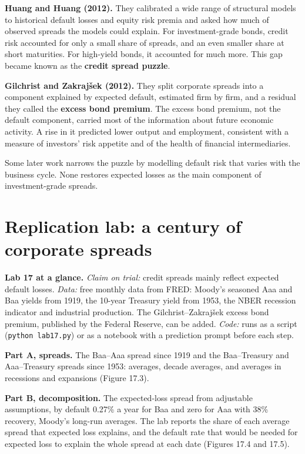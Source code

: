 \textbf{Huang and Huang (2012).} They calibrated a wide range of structural models to historical default losses and equity risk premia and asked how much of observed spreads the models could explain. For investment-grade bonds, credit risk accounted for only a small share of spreads, and an even smaller share at short maturities. For high-yield bonds, it accounted for much more. This gap became known as the \textbf{credit spread puzzle}.

\textbf{Gilchrist and Zakraj\v{s}ek (2012).} They split corporate spreads into a component explained by expected default, estimated firm by firm, and a residual they called the \textbf{excess bond premium}. The excess bond premium, not the default component, carried most of the information about future economic activity. A rise in it predicted lower output and employment, consistent with a measure of investors' risk appetite and of the health of financial intermediaries.

Some later work narrows the puzzle by modelling default risk that varies with the business cycle. None restores expected losses as the main component of investment-grade spreads.

\section{Replication lab: a century of corporate spreads}
\label{sec:17-lab}

\begin{callout}
\textbf{Lab 17 at a glance.} \emph{Claim on trial:} credit spreads mainly reflect expected default losses. \emph{Data:} free monthly data from FRED: Moody's seasoned Aaa and Baa yields from 1919, the 10-year Treasury yield from 1953, the NBER recession indicator and industrial production. The Gilchrist--Zakraj\v{s}ek excess bond premium, published by the Federal Reserve, can be added. \emph{Code:} runs as a script (\texttt{python lab17.py}) or as a notebook with a prediction prompt before each step.
\end{callout}

\textbf{Part A, spreads.} The Baa--Aaa spread since 1919 and the Baa--Treasury and Aaa--Treasury spreads since 1953: averages, decade averages, and averages in recessions and expansions (Figure 17.3).

\textbf{Part B, decomposition.} The expected-loss spread from adjustable assumptions, by default 0.27\% a year for Baa and zero for Aaa with 38\% recovery, Moody's long-run averages. The lab reports the share of each average spread that expected loss explains, and the default rate that would be needed for expected loss to explain the whole spread at each date (Figures 17.4 and 17.5).

